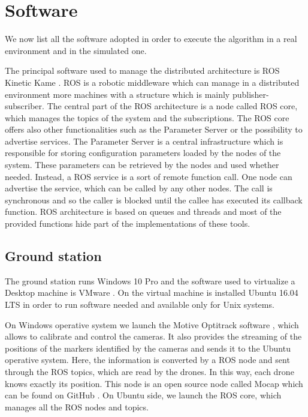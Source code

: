 \section{Software}

We now list all the software adopted in order to execute the algorithm
in a real environment and in the simulated one.

The principal software used to manage the distributed architecture is ROS Kinetic
Kame \cite{ros}.
ROS is a robotic middleware which can manage in a distributed environment more
machines with a structure which is mainly publisher-subscriber.
The central part of the ROS architecture is a node called ROS core, which manages
the topics of the system and the subscriptions.
The ROS core offers also other functionalities such as the Parameter Server or the
possibility to advertise services.
The Parameter Server is a central infrastructure which is responsible for storing
configuration parameters loaded by the nodes of the system.
These parameters can be retrieved by the nodes and used whether needed.
Instead, a ROS service is a sort of remote function call. One node can advertise
the service, which can be called by any other nodes. The call is synchronous and
so the caller is blocked until the callee has executed its callback function.
ROS architecture is based on queues and threads and most of the provided functions
hide part of the implementations of these tools.


\subsection{Ground station}
The ground station runs Windows 10 Pro \cite{windows} and the software used to virtualize a
Desktop machine is VMware \cite{vmware}.
On the virtual machine is installed Ubuntu 16.04 LTS \cite{ubuntu} in order to run software
needed and available only for Unix systems.

On Windows operative system we launch the Motive Optitrack software \cite{optitrack},
which allows to calibrate and control the cameras. It also provides the streaming of
the positions of the markers identified by the cameras and sends it to the Ubuntu
operative system.
Here, the information is converted by a ROS node and sent through the ROS topics,
which are read by the drones. In this way, each drone knows exactly its position.
This node is an open source node called Mocap which can be found on GitHub \cite{mocap}.
On Ubuntu side, we launch the ROS core, which manages all the ROS nodes and topics.

